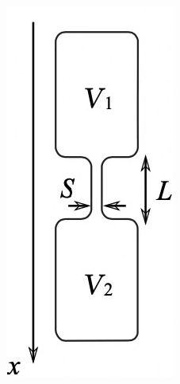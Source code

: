 \begin{center}
\begin{minipage}{0.1\textwidth}
  \includegraphics[width=1.5\linewidth]{1.jpg}

\end{minipage}
\end{center}
